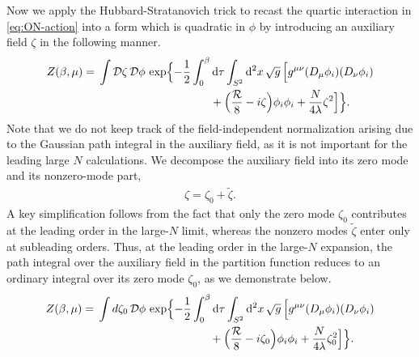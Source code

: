 \documentclass[a4paper,11pt]{article}
\newcommand{\dd}{\mathrm d}
\begin{document}
Now we apply the Hubbard-Stratanovich trick to recast the quartic interaction in \eqref{eq:ON-action} into a form which is quadratic in $\phi$ by introducing an auxiliary field $\zeta$ in the following manner.
\begin{align}
 Z(\beta,\mu)
 ={}&\int\mathcal D\zeta\,\mathcal D\phi\,
 \exp\Bigl\{-\frac12\int_0^\beta\dd\tau
 \int_{S^2}\dd^2x\,\sqrt g\,\Bigl[
 g^{\mu\nu}(D_\mu\phi_i)(D_\nu\phi_i)
 \nonumber\\
 &\hspace{35mm}
 +\Big(\frac{\mathcal R}{8}-i\zeta\Big)\phi_i\phi_i
 +\frac{N}{4\lambda}\zeta^2
 \Bigr]\Bigr\}.
 \label{eq:HS-path-integral}
\end{align}
Note that we do not keep track of the field-independent normalization arising due to the Gaussian path integral in the auxiliary field, as it is not important for the leading large $N$ calculations.
We decompose the auxiliary field into its zero mode and its nonzero-mode
part,
\begin{align}
    \zeta=\zeta_0+\tilde \zeta.
    \label{eq:zeta-mode-decomposition}
\end{align}
A key simplification follows from the fact that only the zero mode
$\zeta_0$ contributes at the leading order in the large-$N$ limit, whereas the
nonzero modes $\tilde \zeta$ enter only at subleading orders.  Thus, at the leading order in the large-$N$ expansion, the path integral over the auxiliary field in the partition function reduces to an ordinary integral over its zero mode $\zeta_0$, as we demonstrate below.
\begin{align}
	Z(\beta,\mu)
	={}&\int d\zeta_0\,\mathcal D\phi\,
	\exp\Bigl\{-\frac12\int_0^\beta\dd\tau
	\int_{S^2}\dd^2x\,\sqrt g\,\Bigl[
	g^{\mu\nu}(D_\mu\phi_i)(D_\nu\phi_i)
	\nonumber\\
	&\hspace{35mm}
	+\Big(\frac{\mathcal R}{8}-i\zeta_0\Big)\phi_i\phi_i
	+\frac{N}{4\lambda}\zeta_0^2
	\Bigr]\Bigr\}.
	\label{eq:zero-mode-path-integral}
\end{align}
\end{document}
